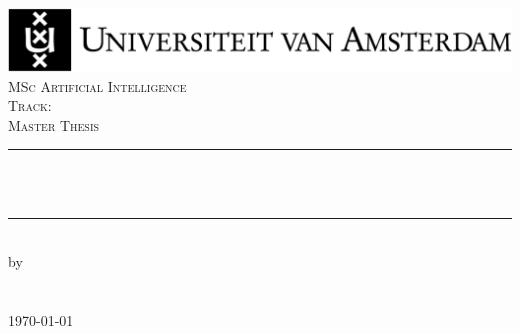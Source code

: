 
\begin{titlepage}

\newcommand{\HRule}{\rule{\linewidth}{0.5mm}} %
\center %
 

\includegraphics[width=\linewidth]{figures/UvA_logo}\\[2.5cm]

\textsc{\Large MSc Artificial Intelligence}\\[0.2cm]
\textsc{\normalsize Track: }\\[1.0cm] %
\textsc{\Large Master Thesis}\\[0.5cm] 


\HRule \\[0.4cm]
{ \huge \bfseries {}}\\[0.4cm] %
\HRule \\[0.5cm]


by\\[0.2cm]
\textsc{\Large {}}\\[0.2cm] %
\\[1cm]



{\Large \today}\\[1cm] %


\end{titlepage}
